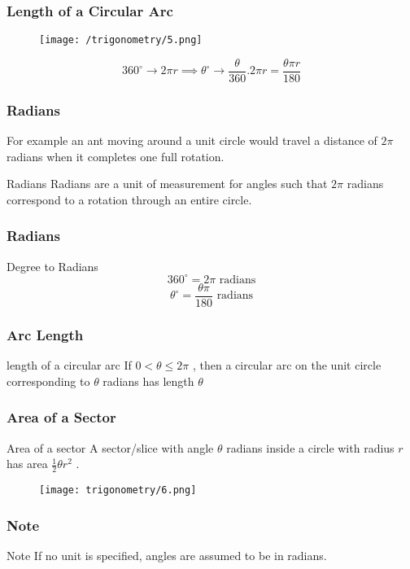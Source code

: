 \documentclass{beamer}
\begin{document}
\begin{frame}
    \frametitle{Length of a Circular Arc}
    \begin{figure}
        \centering
        \texttt{[image: /trigonometry/5.png]}
    \end{figure}
    \[ 360^{\circ}   \rightarrow  2 \pi r \implies \theta^{\circ}  \rightarrow \frac{\theta}{360}.2\pi r  = \frac{\theta \pi r}{180}\] 
\end{frame}

\begin{frame}
    \frametitle{Radians}
    For example an ant moving around a unit circle would travel a distance of $2\pi$ radians when it completes one full rotation.
    \begin{block}{Radians}
        Radians are a unit of measurement for angles such that $2\pi$ radians correspond to a rotation through an entire circle.
    \end{block}
\end{frame}

\begin{frame}
    \frametitle{Radians}
    \begin{block}{Degree to Radians}
        \[ 360^{\circ} = 2 \pi \text{ radians} \]
        \[ \theta ^{\circ}  = \frac{\theta \pi}{180} \text{ radians} \]
    \end{block}
\end{frame}

\begin{frame}
    \frametitle{Arc Length}
    \begin{block}{length of a circular arc}
        If $0 < \theta \leq 2\pi$ , then a circular arc on the unit circle corresponding to $\theta$ radians has length $\theta$         
    \end{block}
\end{frame}

\begin{frame}
    \frametitle{Area of a Sector}
    \begin{block}{Area of a sector}
        A sector/slice with angle $\theta$ radians inside a circle with radius $r$ has area $\frac{1}{2} \theta r^{2}$ .
    \end{block}
    \begin{figure}[h]    
        \centering
        \texttt{[image: trigonometry/6.png]}
    \end{figure}
\end{frame}

\begin{frame}
    \frametitle{Note}
    \begin{block}{Note}
        If no unit is specified, angles are assumed to be in radians.
    \end{block}
\end{frame}
\end{document}
